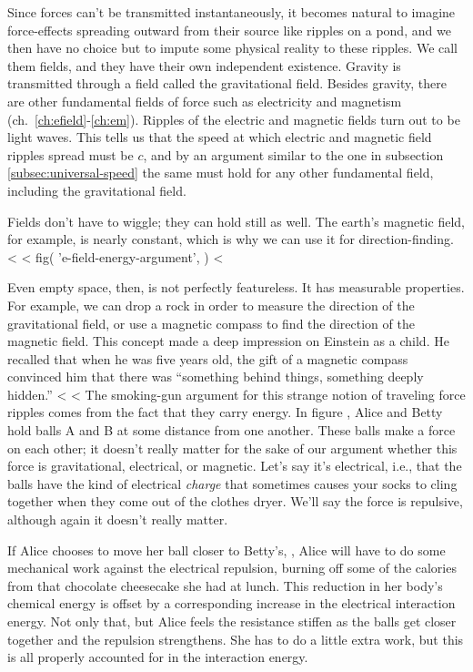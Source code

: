 Since forces can't be transmitted instantaneously, it becomes natural to imagine force-effects
spreading outward from their source like ripples on a pond, and we then have no choice but to
impute some physical reality to these ripples. We call them fields, and they have their own
independent existence. Gravity is transmitted through a field called the gravitational field.
Besides gravity, there are other fundamental fields of force such as electricity and magnetism
(ch.~\ref{ch:efield}-\ref{ch:em}). Ripples of the electric and magnetic fields
turn out to be light waves. This tells us that the speed at which electric and magnetic field
ripples spread must be $c$, and by an argument similar to the one in subsection
\ref{subsec:universal-speed} the same must hold for any other fundamental field, including
the gravitational field.

Fields don't have to wiggle; they can hold still as well. The earth's magnetic
field, for example, is nearly constant, which is why we can use it for direction-finding.
<%
<%
  fig(
    'e-field-energy-argument',
  )
<%

Even empty space, then, is not perfectly featureless. It has measurable
properties. For example, we can drop a rock in order to measure the direction of the gravitational
field, or use a magnetic compass to find the direction of the magnetic field. This concept made a deep impression
on Einstein as a child. He recalled that
when he was five years old, the gift of a magnetic compass convinced him that there was ``something behind things, something deeply hidden.''
<%
<%
The smoking-gun argument for this strange notion of
traveling force ripples comes from the fact that they carry energy. In figure ,
Alice and Betty hold balls A and B at some distance from one another.
These balls make a force on each other; it doesn't really matter for the sake of our argument
whether this force is gravitational, electrical, or magnetic. Let's say it's electrical, i.e., that the balls
have the kind of electrical \emph{charge} that sometimes causes your socks to cling together when they come out
of the clothes dryer. We'll say the force is repulsive, although again it doesn't really matter.

If Alice chooses to move
her ball closer to Betty's, , Alice will have to do some mechanical work
against the electrical repulsion, burning off some of the calories from that
chocolate cheesecake she had at lunch.
This reduction in
her body's chemical energy is offset by a corresponding increase in the electrical interaction energy.
Not only that, but Alice feels the resistance stiffen as the balls get closer together
and the repulsion strengthens. 
She has to do a little extra work, but this is all properly accounted for in the interaction energy.


